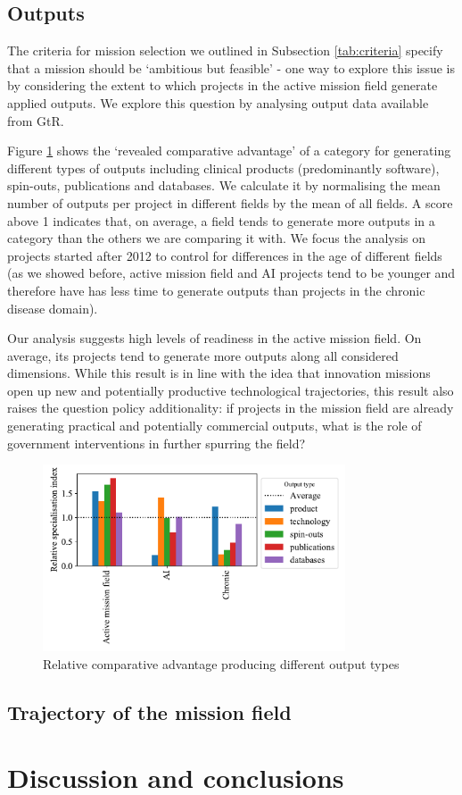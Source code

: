 \documentclass[11pt]{article}
\begin{document}
\subsection{Outputs}
The criteria for mission selection we outlined in Subsection \ref{tab:criteria} specify that a mission should be `ambitious but feasible’ - one way to explore this issue is by considering the extent to which projects in the active mission field generate applied outputs. We explore this question by analysing output data available from GtR.

Figure \ref{fig:outputs} shows the ‘revealed comparative advantage’ of a category for generating different types of outputs including clinical products (predominantly software), spin-outs, publications and databases. We calculate it by normalising the mean number of outputs per project in different fields by the mean of all fields. A score above 1 indicates that, on average, a field tends to generate more outputs in a category than the others we are comparing it with. We focus the analysis on projects started after 2012 to control for differences in the age of different fields (as we showed before, active mission field and AI projects tend to be younger and therefore have has less time to generate outputs than projects in the chronic disease domain).

Our analysis suggests high levels of readiness in the active mission field. On average, its projects tend to generate more outputs along all considered dimensions. While this result is in line with the idea that innovation missions  open up new and potentially productive technological trajectories, this result also raises the question policy additionality: if projects in the mission field are already generating practical and potentially commercial outputs, what is the role of government interventions in further spurring the field?

\begin{figure}[!ht]
    \centering
    \includegraphics[width=0.8\textwidth]{figures/fig_17_outputs.pdf}
    \caption{Relative comparative advantage producing different output types}
    \label{fig:outputs}
\end{figure}

\subsection{Trajectory of the mission field}
\label{subsec:trajectory}
\section{Discussion and conclusions}





%
\end{document}
